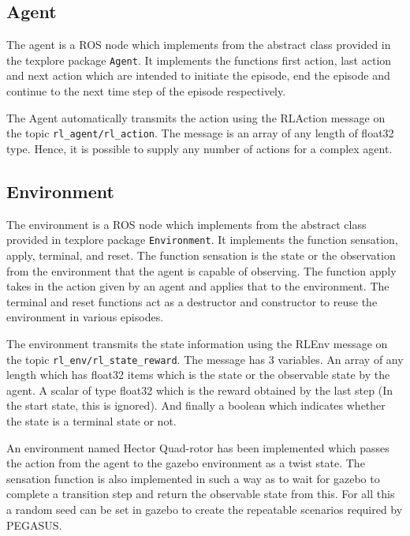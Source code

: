 \documentclass[hidelinks,BTech]{iitmdiss}
\begin{document}
\subsection*{Agent}

The agent is a ROS node which implements from the abstract class provided in the texplore package \texttt{Agent}. It implements the functions first action, last action and next action which are intended to initiate the episode, end the episode and continue to the next time step of the episode respectively.

The Agent automatically transmits the action using the RLAction message on the topic \texttt{rl\_agent/rl\_action}. The message is an array of any length of float32 type. Hence, it is possible to supply any number of actions for a complex agent.

\subsection*{Environment}

The environment is a ROS node which implements from the abstract class provided in texplore package \texttt{Environment}. It implements the function sensation, apply, terminal, and reset. The function sensation is the state or the observation from the environment that the agent is capable of observing. The function apply takes in the action given by an agent and applies that to the environment. The terminal and reset functions act as a destructor and constructor to reuse the environment in various episodes.

The environment transmits the state information using the RLEnv message on the topic \texttt{rl\_env/rl\_state\_reward}. The message has 3 variables. An array of any length which has float32 items which is the state or the observable state by the agent. A scalar of type float32 which is the reward obtained by the last step (In the start state, this is ignored). And finally a boolean which indicates whether the state is a terminal state or not.

An environment named Hector Quad-rotor has been implemented which passes the action from the agent to the gazebo environment as a twist state. The sensation function is also implemented in such a way as to wait for gazebo to complete a transition step and return the observable state from this. For all this a random seed can be set in gazebo to create the repeatable scenarios required by PEGASUS.

\end{document}
